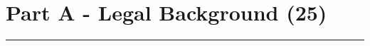 \section*{Part A - Legal Background (25)}

\noindent \begin{center}
\rule[0.5ex]{1\linewidth}{1pt}
\par\end{center}

\begin{comment}
Hacking has been criminalized in many countries around the globe, including
South Africa. The Electronic Communications and Transaction Act 25 of 2002
was the first Act to create hacking crimes, and now the Cyber crime and 
Cyber security Bill plans to expand on that. Draft an academic essay (8-10 pages)
addressing the following issues:
     Identify to what extent existing South Africa and planned legislation com-
    pares to the Cyber crime legislation in the United States and Europe.
     Discuss whether the proposed Cyber crime and Cyber security Bill will im-
    prove the legislative ability to address hacking as a crime, and motivate
    your reasoning.
     Discuss areas that you feel where the proposed Cyber crime and Cyber 
    security Bill could have a negative impact on the cyber security profession,
    and motivate your reasoning.
Your discussion should be 8-10 pages long excluding references.
    
\end{comment}